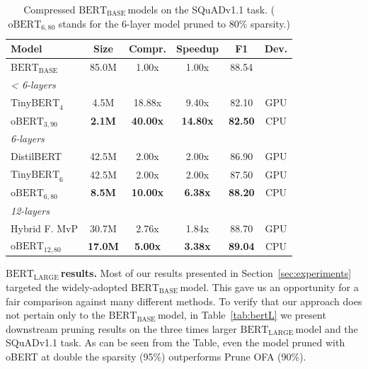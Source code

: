 \documentclass[11pt]{article}
\newcommand{\bert}{$\textrm{BERT}_{\textrm{BASE}}\,$}
\newcommand{\bertL}{$\textrm{BERT}_{\textrm{LARGE}}\,$}
\begin{document}
\begin{table}[h!]
\setlength{\tabcolsep}{4pt}
    \caption{Compressed \bert models on the SQuADv1.1 task. ($\textrm{oBERT}_{6,80}$ stands for the 6-layer model pruned to 80\% sparsity.)}
    \label{tab:other-methods}
    \centering
    {\small 
    \begin{tabular}{lccccc}
    \toprule 
    Model & Size & Compr. & Speedup & F1 & Dev. \\
    \midrule
    \bert & 85.0M & \phantom{1}1.00x & \phantom{1}1.00x & 88.54 &\\
    \midrule
    \multicolumn{5}{l}{\textit{< 6-layers}} \\
    $\textrm{TinyBERT}_4$ & \phantom{8}4.5M & 18.88x & \phantom{1}9.40x & 82.10 & GPU\\
    $\textrm{oBERT}_{3,90}$ & \phantom{8}\textbf{2.1M} & \textbf{40.00x} & \textbf{14.80x} & \textbf{82.50} & CPU\\
    \midrule
    \multicolumn{5}{l}{\textit{6-layers}} \\
    DistilBERT & 42.5M & \phantom{1}2.00x & 2.00x & 86.90 & GPU\\
    $\textrm{TinyBERT}_6$ & 42.5M & \phantom{1}2.00x & 2.00x & 87.50 & GPU\\
    $\textrm{oBERT}_{6,80}$ & \phantom{1}\textbf{8.5M} & \textbf{10.00x} & \textbf{6.38x} & \textbf{88.20} & CPU\\ 
    \midrule
    \multicolumn{5}{l}{\textit{12-layers}} \\
    Hybrid F. MvP & 30.7M & \phantom{1}2.76x & 1.84x & 88.70 & GPU\\
    $\textrm{oBERT}_{12,80}$ & \textbf{17.0M} & \phantom{1}\textbf{5.00x} & \textbf{3.38x} & \textbf{89.04} & CPU\\
    \bottomrule
    \end{tabular}
    }
\end{table}

\noindent\textbf{\bertL results.} Most of our results presented in Section~\ref{sec:experiments} targeted the widely-adopted \bert model. This gave us an opportunity for a fair comparison against many different methods. To verify that our approach does not pertain only to the \bert model, in Table~\ref{tab:bertL} we present downstream pruning results on the three times larger \bertL model and the SQuADv1.1 task. As can be seen from the Table, even the model pruned with oBERT at double the sparsity (95\%) outperforms Prune OFA (90\%).
\end{document}
